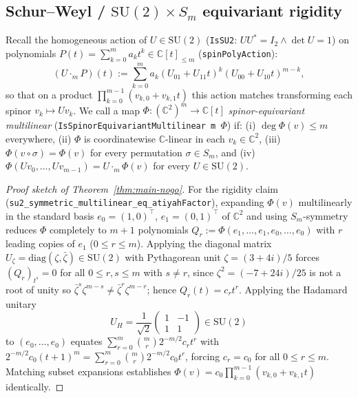 \documentclass[11pt,reqno]{amsart}
\theoremstyle{remark}
\newcommand{\C}{\mathbb{C}}
\begin{document}
\subsection{Schur--Weyl / $\mathrm{SU}(2) \times S_m$ equivariant rigidity}
Recall the homogeneous action of $U \in \mathrm{SU}(2)$ (\texttt{IsSU2}: $U U^* = I_2 \land \det U = 1$) on polynomials $P(t) = \sum_{k=0}^m a_k t^k \in \C[t]_{\le m}$ (\texttt{spinPolyAction}):
\[
  (U \cdot_m P)(t) := \sum_{k=0}^{m} a_k (U_{01} + U_{11} t)^k (U_{00} + U_{10} t)^{m-k},
\]
so that on a product $\prod_{k=0}^{m-1} (v_{k,0} + v_{k,1} t)$ this action matches transforming each spinor $v_k \mapsto U v_k$.
We call a map $\Phi : (\C^2)^m \to \C[t]$ \emph{spinor-equivariant multilinear} (\texttt{IsSpinor\allowbreak Equivariant\allowbreak Multilinear m $\Phi$}) if:
(i) $\deg \Phi(v) \le m$ everywhere,
(ii) $\Phi$ is coordinatewise $\C$-linear in each $v_k \in \C^2$,
(iii) $\Phi(v \circ \sigma) = \Phi(v)$ for every permutation $\sigma \in S_m$, and
(iv) $\Phi(U v_0, \dots, U v_{m-1}) = U \cdot_m \Phi(v)$ for every $U \in \mathrm{SU}(2)$.

\begin{proof}[Proof sketch of Theorem~\ref{thm:main-nogo}]
For the rigidity claim (\texttt{su2\_symmetric\_multilinear\_eq\_atiyahFactor}), expanding $\Phi(v)$ multilinearly in the standard basis $e_0 = (1, 0)^\top$, $e_1 = (0, 1)^\top$ of $\C^2$ and using $S_m$-symmetry reduces $\Phi$ completely to $m + 1$ polynomials $Q_r := \Phi(e_1,\dots,e_1, e_0, \dots, e_0)$ with $r$ leading copies of $e_1$ ($0 \le r \le m$).
Applying the diagonal matrix $U_\zeta = \mathrm{diag}(\zeta, \bar{\zeta}) \in \mathrm{SU}(2)$ with Pythagorean unit $\zeta = (3 + 4i)/5$ forces $(Q_r)_{t^s} = 0$ for all $0 \le r, s \le m$ with $s \ne r$, since $\zeta^2 = (-7 + 24i)/25$ is not a root of unity so $\bar{\zeta}^s \zeta^{m-s} \ne \bar{\zeta}^r \zeta^{m-r}$; hence $Q_r(t) = c_r t^r$.
Applying the Hadamard unitary
\[
  U_H = \frac{1}{\sqrt{2}}\begin{pmatrix} 1 & -1 \\ 1 & 1 \end{pmatrix} \in \mathrm{SU}(2)
\]
to $(e_0, \dots, e_0)$ equates $\sum_{r=0}^m \binom{m}{r} 2^{-m/2} c_r t^r$ with $2^{-m/2} c_0 (t + 1)^m = \sum_{r=0}^m \binom{m}{r} 2^{-m/2} c_0 t^r$, forcing $c_r = c_0$ for all $0 \le r \le m$.
Matching subset expansions establishes $\Phi(v) = c_0 \prod_{k=0}^{m-1} (v_{k,0} + v_{k,1} t)$ identically.
\end{proof}
\end{document}
